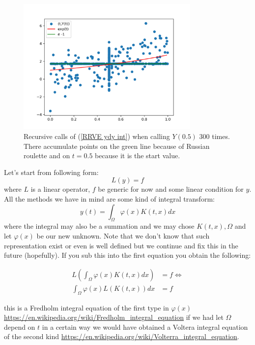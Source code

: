 \documentclass[a4paper,12pt]{article}
\begin{document}
\begin{example}[$y'=y$]
    \begin{figure}[h!]
        \centering
        \includegraphics[width=0.8\textwidth]{plots/ydy int.png}
        \caption{Recursive calls of (\ref{RRVE ydy int}) when
            calling $Y(0.5)$ $300$ times. There accumulate points
            on the green line because of Russian roulette and on $t=0.5$
            because it is the start value.
        }
        \label{fig:ydy int}
    \end{figure}

\end{example}


Let's start from following form:
$$
    L(y)= f
$$
where $L$ is a linear operator, $f$ be generic for now and some linear condition
for $y$. All the methods we have in mind are some kind of integral transform:
$$
    y(t) = \int_{\Omega} \varphi(x) K(t,x)dx
$$
where the integral may also be a summation and we may chose $K(t,x), \Omega$ and let $\varphi(x)$ be our new unknown. Note that we don't know that such representation exist or even is well defined but we continue and fix this in the future (hopefully). If you sub this into the first equation you obtain the following:

\begin{align*}
    L \left(\int_{\Omega} \varphi(x) K(t,x)dx \right) & = f \Leftrightarrow \\
    \int_{\Omega} \varphi(x) L \left(K(t,x) \right)dx & = f
\end{align*}

this is a Fredholm integral equation of the first type in $\varphi(x)$
\url{https://en.wikipedia.org/wiki/Fredholm_integral_equation}
if we had
let $\Omega$ depend on $t$ in a certain way we would have obtained a Voltera integral
equation of the second kind
\url{https://en.wikipedia.org/wiki/Volterra_integral_equation}.
\end{document}
